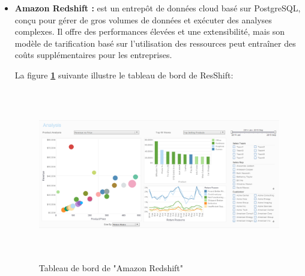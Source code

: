 \begin{itemize}
    \item\textbf{Amazon Redshift :} est un entrepôt de données cloud basé sur PostgreSQL, conçu pour gérer de gros volumes de données et exécuter des analyses complexes.
    Il offre des performances élevées et une extensibilité, mais son modèle de tarification basé sur l'utilisation des ressources peut entraîner des coûts supplémentaires pour les entreprises.
    \par La figure \textbf{\ref{fig:RS}} suivante illustre le tableau de bord de ResShift:
            \begin{figure}[H]
            \centering
            \includegraphics[width =13cm, height=7.5cm]{img/captures/redshift}
            \caption{Tableau de bord de "Amazon Redshift"}
            \label{fig:RS}
            \end{figure}
\end{itemize}
